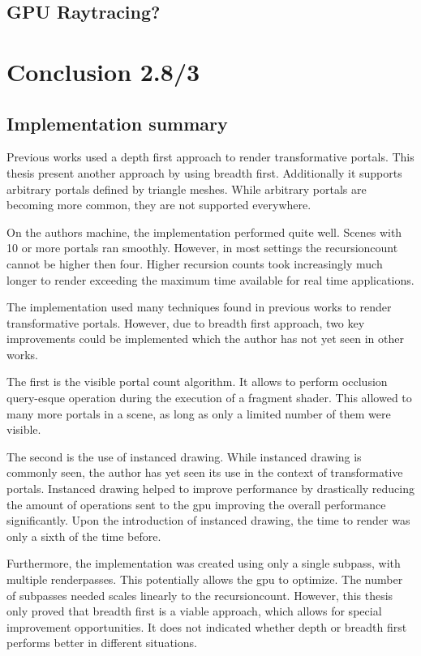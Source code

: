 \subsection{GPU Raytracing?}
\section{Conclusion 2.8/3}

\subsection{Implementation summary}

Previous works used a depth first approach to render transformative portals. This thesis present another approach by using breadth first. Additionally it supports arbitrary portals defined by triangle meshes. While arbitrary portals are becoming more common, they are not supported everywhere.

On the authors machine, the implementation performed quite well. Scenes with 10 or more portals ran smoothly. However, in most settings the \gls{recursioncount} cannot be higher then four. Higher recursion counts took increasingly much longer to render exceeding the maximum time available for real time applications.



The implementation used many techniques found in previous works to render transformative portals. However, due to breadth first approach, two key improvements could be implemented which the author has not yet seen in other works.

The first is the visible portal count algorithm. It allows to perform occlusion query-esque operation during the execution of a fragment shader. This allowed to many more portals in a scene, as long as only a limited number of them were visible. 

The second is the use of instanced drawing. While instanced drawing is commonly seen, the author has yet seen its use in the context of transformative portals. Instanced drawing helped to improve performance by drastically reducing the amount of operations sent to the \gls{gpu} improving the overall performance significantly. Upon the introduction of instanced drawing, the time to render was only a sixth of the time before.

Furthermore, the implementation was created using only a single subpass, with multiple renderpasses. This potentially allows the \gls{gpu} to optimize. The number of subpasses needed scales linearly to the \gls{recursioncount}. However, this thesis only proved that breadth first is a viable approach, which allows for special improvement opportunities. It does not indicated whether depth or breadth first performs better in different situations.

